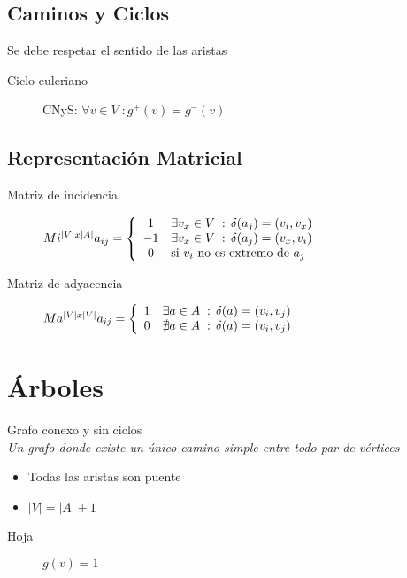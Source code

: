 \documentclass[a4paper,twocolumn]{article}
\numberwithin{equation}{section}
\numberwithin{figure}{section}
\numberwithin{table}{section}
\newcommand{\refa}[1]{}
\newcommand{\talque}{\;:\,} %
\begin{document}
\subsection{Caminos y Ciclos}
Se debe respetar el sentido de las aristas
\begin{description}
	\item[Ciclo euleriano] CNyS: $\forall v \in V \;: g^+(v) = g^-(v)$
\end{description}

\subsection{Representaci\'on Matricial}
\begin{description}
	\item[Matriz de incidencia] $Mi^{|V|x|A|} \\ a_{ij} = \left\{
\begin{array}{c l}
 1 & \exists v_x \in V \talque \delta(a_j) = (v_i, v_x)\\
 -1 & \exists v_x \in V \talque \delta(a_j) = (v_x, v_i)\\
 0 & \textup{si $v_i$ no es extremo de } a_j\\
\end{array}
\right.
$
    \item[Matriz de adyacencia]$Ma^{|V|x|V|} \\ a_{ij}= \left\{
\begin{array}{c l}
 1 & \exists a \in A \talque \delta(a) = (v_i, v_j)\\
 0 & \nexists a \in A \talque \delta(a) = (v_i, v_j)\\
\end{array}
\right.
$
\end{description}


\section{\'Arboles}
Grafo conexo y sin ciclos\\
\emph{Un grafo donde existe un \'unico camino simple entre todo par de v\'ertices}
\begin{itemize}
	\item Todas las aristas son puente\refa{puente}
    \item $|V| = |A| +1$
\end{itemize}
\begin{description}
	\item[Hoja] $g(v) = 1$
\end{description}
\end{document}
